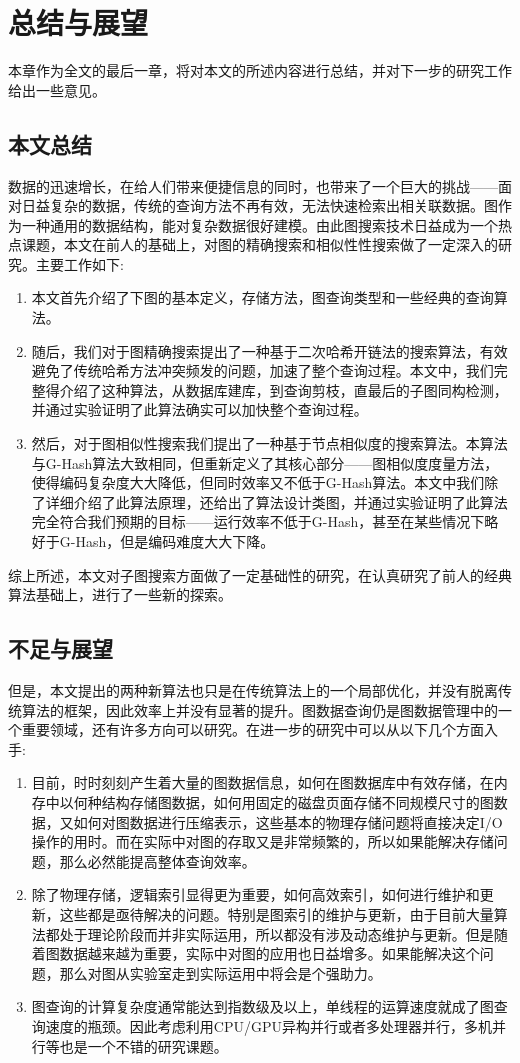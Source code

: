 \documentclass{XDBAthesis}
\begin{document}
\else
\fi
\chapter{总结与展望}
\label{chap:future}
本章作为全文的最后一章，将对本文的所述内容进行总结，并对下一步的研究工作给出一些意见。
\section{本文总结}
数据的迅速增长，在给人们带来便捷信息的同时，也带来了一个巨大的挑战——面对日益复杂的数据，传统的查询方法不再有效，无法快速检索出相关联数据。图作为一种通用的数据结构，能对复杂数据很好建模。由此图搜索技术日益成为一个热点课题，本文在前人的基础上，对图的精确搜索和相似性性搜索做了一定深入的研究。主要工作如下:
\begin{enumerate}
    \item 本文首先介绍了下图的基本定义，存储方法，图查询类型和一些经典的查询算法。
    \item 随后，我们对于图精确搜索提出了一种基于二次哈希开链法的搜索算法，有效避免了传统哈希方法冲突频发的问题，加速了整个查询过程。本文中，我们完整得介绍了这种算法，从数据库建库，到查询剪枝，直最后的子图同构检测，并通过实验证明了此算法确实可以加快整个查询过程。
    \item 然后，对于图相似性搜索我们提出了一种基于节点相似度的搜索算法。本算法与G-Hash算法大致相同，但重新定义了其核心部分——图相似度度量方法，使得编码复杂度大大降低，但同时效率又不低于G-Hash算法。本文中我们除了详细介绍了此算法原理，还给出了算法设计类图，并通过实验证明了此算法完全符合我们预期的目标——运行效率不低于G-Hash，甚至在某些情况下略好于G-Hash，但是编码难度大大下降。
\end{enumerate}

综上所述，本文对子图搜索方面做了一定基础性的研究，在认真研究了前人的经典算法基础上，进行了一些新的探索。
\section{不足与展望}
但是，本文提出的两种新算法也只是在传统算法上的一个局部优化，并没有脱离传统算法的框架，因此效率上并没有显著的提升。图数据查询仍是图数据管理中的一个重要领域，还有许多方向可以研究。在进一步的研究中可以从以下几个方面入手:
\begin{enumerate}
    \item 目前，时时刻刻产生着大量的图数据信息，如何在图数据库中有效存储，在内存中以何种结构存储图数据，如何用固定的磁盘页面存储不同规模尺寸的图数据，又如何对图数据进行压缩表示，这些基本的物理存储问题将直接决定I/O操作的用时。而在实际中对图的存取又是非常频繁的，所以如果能解决存储问题，那么必然能提高整体查询效率。
    \item 除了物理存储，逻辑索引显得更为重要，如何高效索引，如何进行维护和更新，这些都是亟待解决的问题。特别是图索引的维护与更新，由于目前大量算法都处于理论阶段而并非实际运用，所以都没有涉及动态维护与更新。但是随着图数据越来越为重要，实际中对图的应用也日益增多。如果能解决这个问题，那么对图从实验室走到实际运用中将会是个强助力。
    \item 图查询的计算复杂度通常能达到指数级及以上，单线程的运算速度就成了图查询速度的瓶颈。因此考虑利用CPU/GPU异构并行或者多处理器并行，多机并行等也是一个不错的研究课题。
\end{enumerate}


\ifx\allfiles\undefined
%

\end{document}
